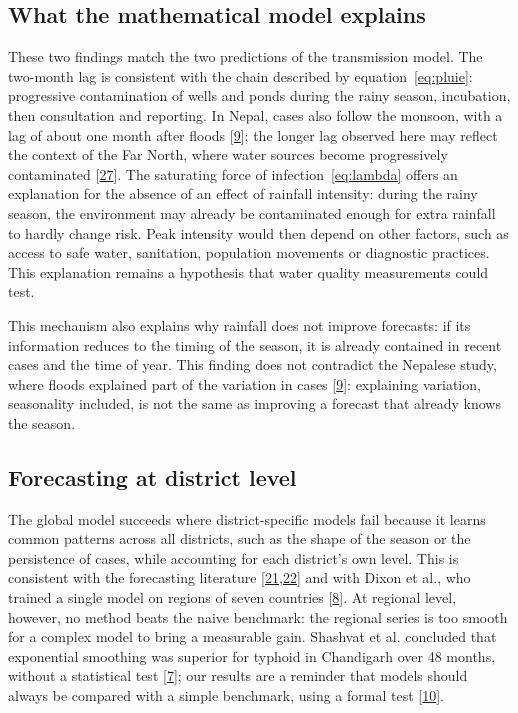 \documentclass[11pt]{article}
\begin{document}
\subsection{What the mathematical model explains}
These two findings match the two predictions of the transmission model. The two-month lag is consistent with the chain described by equation~\eqref{eq:pluie}: progressive contamination of wells and ponds during the rainy season, incubation, then consultation and reporting. In Nepal, cases also follow the monsoon, with a lag of about one month after floods [\hyperlink{ref9}{9}]; the longer lag observed here may reflect the context of the Far North, where water sources become progressively contaminated [\hyperlink{ref27}{27}]. The saturating force of infection~\eqref{eq:lambda} offers an explanation for the absence of an effect of rainfall intensity: during the rainy season, the environment may already be contaminated enough for extra rainfall to hardly change risk. Peak intensity would then depend on other factors, such as access to safe water, sanitation, population movements or diagnostic practices. This explanation remains a hypothesis that water quality measurements could test.

This mechanism also explains why rainfall does not improve forecasts: if its information reduces to the timing of the season, it is already contained in recent cases and the time of year. This finding does not contradict the Nepalese study, where floods explained part of the variation in cases [\hyperlink{ref9}{9}]: explaining variation, seasonality included, is not the same as improving a forecast that already knows the season.

\subsection{Forecasting at district level}
The global model succeeds where district-specific models fail because it learns common patterns across all districts, such as the shape of the season or the persistence of cases, while accounting for each district's own level. This is consistent with the forecasting literature [\hyperlink{ref21}{21},\hyperlink{ref22}{22}] and with Dixon et al., who trained a single model on regions of seven countries [\hyperlink{ref8}{8}]. At regional level, however, no method beats the naive benchmark: the regional series is too smooth for a complex model to bring a measurable gain. Shashvat et al. concluded that exponential smoothing was superior for typhoid in Chandigarh over 48 months, without a statistical test [\hyperlink{ref7}{7}]; our results are a reminder that models should always be compared with a simple benchmark, using a formal test [\hyperlink{ref10}{10}].
\end{document}
